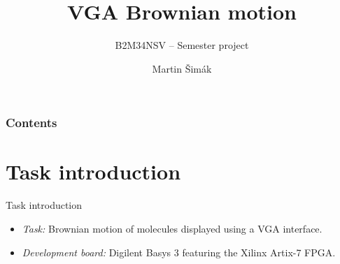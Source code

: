 \documentclass[aspectratio=169, 11pt, hyperref={unicode}]{beamer}
\title{VGA Brownian motion}
\subtitle{B2M34NSV -- Semester project}
\author{Martin Šimák}
\date{\displaydate{Date}}
\begin{document}

\begin{frame}
	\titlepage
\end{frame}

\begin{frame}
    \frametitle{Contents}
    \tableofcontents
\end{frame}

\section{Task introduction}
\begin{frame}{Task introduction}
\begin{itemize}
    \item \emph{Task:} Brownian motion of molecules displayed using a VGA interface.
    \item \emph{Development board:} Digilent Basys 3 featuring the Xilinx Artix-7 FPGA.
\end{itemize}
\end{frame}
\end{document}
